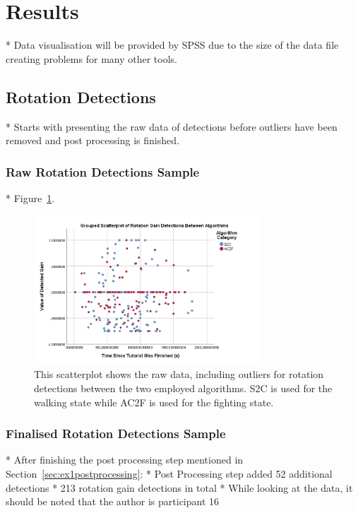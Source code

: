 \section{Results}\label{sec:ex1results}
* Data visualisation will be provided by SPSS due to the size of the data file creating problems for many other tools. 

\subsection{Rotation Detections}
* Starts with presenting the raw data of detections before outliers have been removed and post processing is finished. 



\subsubsection{Raw Rotation Detections Sample}
* Figure~\ref{fig:rawRotationDetectionData}.
\begin{figure}[tbph]
    \centering
    \includegraphics[width=0.75\textwidth]{figures/graphs/RawRotationDetections.png}
    \caption[Raw Detection Scatterplot For Rotation Gains]{This scatterplot shows the raw data, including outliers for rotation detections between the two employed algorithms. S2C is used for the walking state while AC2F is used for the fighting state.}
    \label{fig:rawRotationDetectionData}
\end{figure}


\subsubsection{Finalised Rotation Detections Sample}
* After finishing the post processing step mentioned in Section~\ref{sec:ex1postprocessing}:
   * Post Processing step added 52 additional detections
* 213 rotation gain detections in total
* While looking at the data, it should be noted that the author is participant 16

